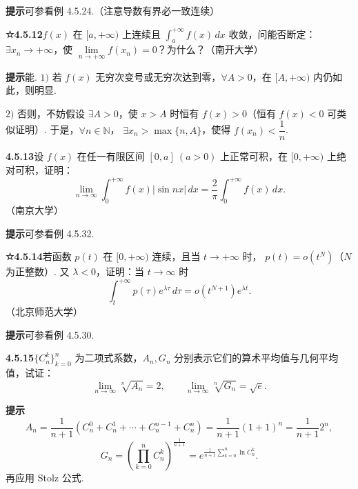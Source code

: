 \documentclass[UTF8,12pt,a4paper,fontset=fandol]{ctexart}
\begin{document}
\noindent\textbf{提示}\quad 可参看例 4.5.24.（注意导数有界必一致连续）

\noindent\textbf{☆4.5.12}\quad $f(x)$ 在 $[a,+\infty)$ 上连续且 $\displaystyle\int_a^{+\infty}f(x)\,dx$ 收敛，问能否断定：
$\exists x_n\to+\infty$，使 $\lim\limits_{n\to+\infty}f(x_n)=0$？为什么？（南开大学）

\noindent\textbf{提示}\quad 能. $1)$ 若 $f(x)$ 无穷次变号或无穷次达到零，$\forall A>0$，在 $[A,+\infty)$ 内仍如此，则明显.

$2)$ 否则，不妨假设 $\exists A>0$，使 $x>A$ 时恒有 $f(x)>0$（恒有 $f(x)<0$ 可类似证明）. 于是，$\forall n\in\mathbb N$，
$\exists x_n>\max\{n,A\}$，使得 $f(x_n)<\dfrac1n$.

\noindent\textbf{4.5.13}\quad 设 $f(x)$ 在任一有限区间 $[0,a]\ (a>0)$ 上正常可积，在 $[0,+\infty)$ 上绝对可积，证明：
\[
\lim_{n\to\infty}\int_0^{+\infty}f(x)|\sin nx|\,dx
=\frac2\pi\int_0^{+\infty}f(x)\,dx.
\]
（南京大学）

\noindent\textbf{提示}\quad 可参看例 4.5.32.

\noindent\textbf{☆4.5.14}\quad 若函数 $p(t)$ 在 $[0,+\infty)$ 连续，且当 $t\to+\infty$ 时，
$p(t)=o(t^N)$（$N$ 为正整数）. 又 $\lambda<0$，证明：当 $t\to\infty$ 时
\[
\int_t^{+\infty}p(\tau)e^{\lambda\tau}\,d\tau=o(t^{N+1})e^{\lambda t}.
\]
（北京师范大学）

\noindent\textbf{提示}\quad 可参看例 4.5.30.

\noindent\textbf{4.5.15}\quad $\{C_n^k\}_{k=0}^n$ 为二项式系数，$A_n,G_n$ 分别表示它们的算术平均值与几何平均值，试证：
\[
\lim_{n\to\infty}\sqrt[n]{A_n}=2,\qquad
\lim_{n\to\infty}\sqrt[n]{G_n}=\sqrt e.
\]

\noindent\textbf{提示}\quad
\[
A_n=\frac1{n+1}(C_n^0+C_n^1+\cdots+C_n^{n-1}+C_n^n)
=\frac1{n+1}(1+1)^n=\frac1{n+1}2^n,
\]
\begin{equation}
G_n=\left(\prod_{k=0}^n C_n^k\right)^{\frac1{n+1}}
=e^{\frac1{n+1}\sum_{k=0}^n\ln C_n^k}. \tag{1}
\end{equation}
再应用 Stolz 公式.
\end{document}
